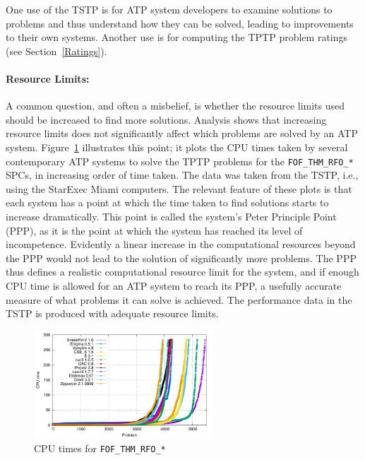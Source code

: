 \documentclass{easychair}
\begin{document}
One use of the TSTP is for ATP system developers to examine solutions to problems and thus 
understand how they can be solved, leading to improvements to their own systems. 
Another use is for computing the TPTP problem ratings (see Section~\ref{Ratings}).

\paragraph{Resource Limits:}
A common question, and often a misbelief, is whether the resource limits used should be increased
to find more solutions.
Analysis shows that increasing resource limits does not significantly affect which problems 
are solved by an ATP system. 
Figure~\ref{PPPPlot} illustrates this point; it plots the CPU times taken by several contemporary 
ATP systems to solve the TPTP problems for the {\tt FOF\_THM\_RFO\_*} SPCs, in increasing order 
of time taken. 
The data was taken from the TSTP, i.e., using the StarExec Miami computers.
The relevant feature of these plots is that each system has a point at which the time taken to 
find solutions starts to increase dramatically. 
This point is called the system's Peter Principle \cite{PH69} Point (PPP), as it is the point at 
which the system has reached its level of incompetence. 
Evidently a linear increase in the computational resources beyond the PPP would not lead to the 
solution of significantly more problems. 
The PPP thus defines a realistic computational resource limit for the system, and if enough CPU 
time is allowed for an ATP system to reach its PPP, a usefully accurate measure of what problems 
it can solve is achieved.
The performance data in the TSTP is produced with adequate resource limits.

\begin{figure}[htb]
\centering
\includegraphics[width=0.6\textwidth]{FOF_THM_RFO_PPP.pdf}
\vspace*{-1em}
\caption{CPU times for {\tt FOF\_THM\_RFO\_*}}
\label{PPPPlot}
\end{figure}
\end{document}
